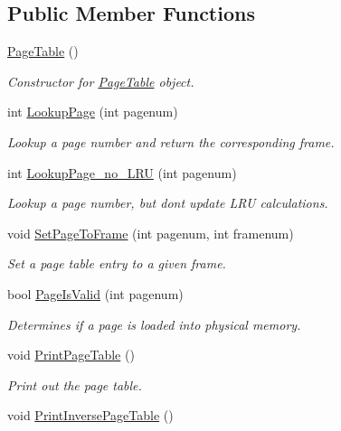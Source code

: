 \subsection*{Public Member Functions}
\begin{DoxyCompactItemize}
\item 
\hyperlink{classPageTable_a75c92e794fd3f5397d2499d54dac22c9}{Page\+Table} ()
\begin{DoxyCompactList}\small\item\em Constructor for \hyperlink{classPageTable}{Page\+Table} object. \end{DoxyCompactList}\item 
int \hyperlink{classPageTable_a2590af90445c76b97420da95cf7210ec}{Lookup\+Page} (int pagenum)
\begin{DoxyCompactList}\small\item\em Lookup a page number and return the corresponding frame. \end{DoxyCompactList}\item 
int \hyperlink{classPageTable_a3444b04644cb833bfd2a9b615704e6a1}{Lookup\+Page\+\_\+no\+\_\+\+L\+RU} (int pagenum)
\begin{DoxyCompactList}\small\item\em Lookup a page number, but don\textquotesingle{}t update L\+RU calculations. \end{DoxyCompactList}\item 
void \hyperlink{classPageTable_ac961a37f5dde09c3addce2fcd118f24d}{Set\+Page\+To\+Frame} (int pagenum, int framenum)
\begin{DoxyCompactList}\small\item\em Set a page table entry to a given frame. \end{DoxyCompactList}\item 
bool \hyperlink{classPageTable_ac43e4430873d7760eb7a25cd9a025f8c}{Page\+Is\+Valid} (int pagenum)
\begin{DoxyCompactList}\small\item\em Determines if a page is loaded into physical memory. \end{DoxyCompactList}\item 
void \hyperlink{classPageTable_ab06580f0815ea97a303a09da860a670b}{Print\+Page\+Table} ()
\begin{DoxyCompactList}\small\item\em Print out the page table. \end{DoxyCompactList}\item 
void \hyperlink{classPageTable_a8b7ab1d3a811eabd0e2862bc9a4ae1f7}{Print\+Inverse\+Page\+Table} ()

\end{DoxyCompactItemize}
